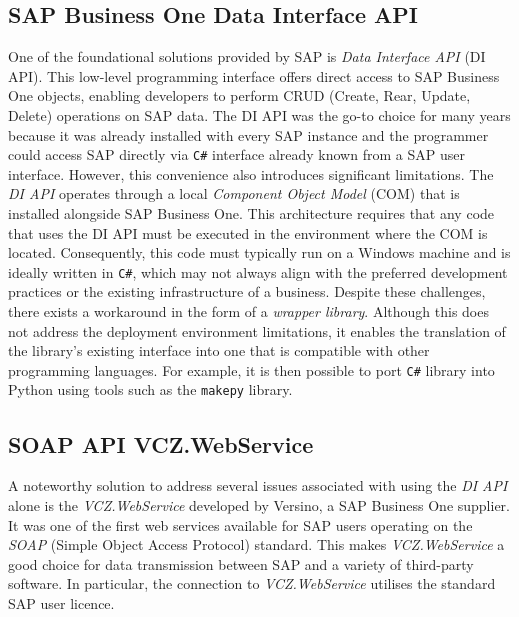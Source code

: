 \subsection{SAP Business One Data Interface API}
\label{subsec:sap-b1-di-api}

One of the foundational solutions provided by SAP is \textit{Data Interface API} (DI API).
This low-level programming interface offers direct access to SAP Business One objects, enabling developers to perform CRUD (Create, Rear, Update, Delete) operations on SAP data. 
The DI API was the go-to choice for many years because it was already installed with every SAP instance and the programmer could access SAP directly via \texttt{C\#} interface already known from a SAP user interface.
However, this convenience also introduces significant limitations.
The \textit{DI API} operates through a local \textit{Component Object Model} (COM) that is installed alongside SAP Business One.
This architecture requires that any code that uses the DI API must be executed in the environment where the COM is located.
Consequently, this code must typically run on a Windows machine and is ideally written in \texttt{C\#}, which may not always align with the preferred development practices or the existing infrastructure of a business.
Despite these challenges, there exists a workaround in the form of a \textit{wrapper library}.
Although this does not address the deployment environment limitations, it enables the translation of the library's existing interface into one that is compatible with other programming languages.
For example, it is then possible to port \texttt{C\#} library into Python using tools such as the \texttt{makepy} library.


\subsection{SOAP API VCZ.WebService}
A noteworthy solution to address several issues associated with using the \textit{DI API} alone  is the \textit{VCZ.WebService} developed by Versino, a SAP Business One supplier. 
It was one of the first web services available for SAP users operating on the \textit{SOAP} (Simple Object Access Protocol) standard. 
This makes \textit{VCZ.WebService} a good choice for data transmission between SAP and a variety of third-party software.
In particular, the connection to \textit{VCZ.WebService} utilises the standard SAP user licence.

